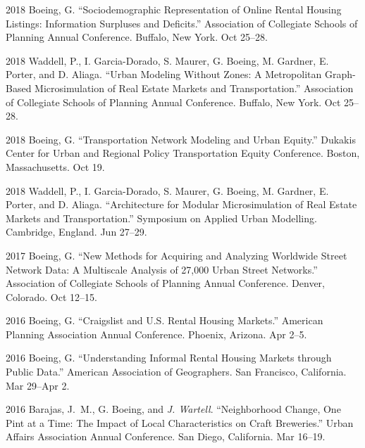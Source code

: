 \documentclass[12pt,letterpaper]{report}
\begin{document}
\begin{tablist}
        \item[2018] \tab Boeing, G. \enquote{Sociodemographic Representation of Online Rental Housing Listings: Information Surpluses and Deficits.} Association of Collegiate Schools of Planning Annual Conference. Buffalo, New York. Oct 25--28.

        \item[2018] \tab Waddell, P., I. Garcia-Dorado, S. Maurer, G. Boeing, M. Gardner, E. Porter, and D. Aliaga. \enquote{Urban Modeling Without Zones: A Metropolitan Graph-Based Microsimulation of Real Estate Markets and Transportation.} Association of Collegiate Schools of Planning Annual Conference. Buffalo, New York. Oct 25--28.

        \item[2018] \tab Boeing, G. \enquote{Transportation Network Modeling and Urban Equity.} Dukakis Center for Urban and Regional Policy Transportation Equity Conference. Boston, Massachusetts. Oct 19.

        \item[2018] \tab Waddell, P., I. Garcia-Dorado, S. Maurer, G. Boeing, M. Gardner, E. Porter, and D. Aliaga. \enquote{Architecture for Modular Microsimulation of Real Estate Markets and Transportation.} Symposium on Applied Urban Modelling. Cambridge, England. Jun 27--29.

        \item[2017] \tab Boeing, G. \enquote{New Methods for Acquiring and Analyzing Worldwide Street Network Data: A Multiscale Analysis of 27,000 Urban Street Networks.} Association of Collegiate Schools of Planning Annual Conference. Denver, Colorado. Oct 12--15.

        \item[2016] \tab Boeing, G. \enquote{Craigslist and U.S. Rental Housing Markets.} American Planning Association Annual Conference. Phoenix, Arizona. Apr 2--5.

        \item[2016] \tab Boeing, G. \enquote{Understanding Informal Rental Housing Markets through Public Data.} American Association of Geographers. San Francisco, California. Mar 29--Apr 2.

        \item[2016] \tab Barajas, J.~M., G. Boeing, and \textit{J. Wartell}. \enquote{Neighborhood Change, One Pint at a Time: The Impact of Local Characteristics on Craft Breweries.} Urban Affairs Association Annual Conference. San Diego, California. Mar 16--19.


\end{tablist}
\end{document}
